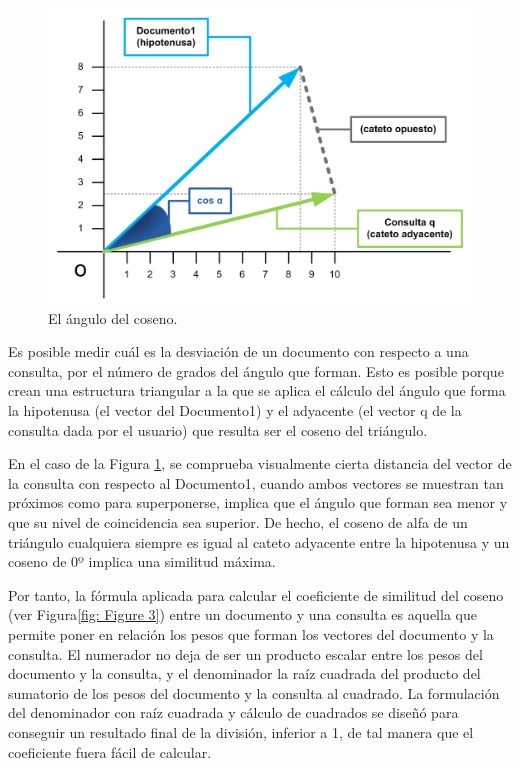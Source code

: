 \documentclass[titlepage]{article}
\begin{document}
\begin{figure}[h]
	\begin{center}
		\includegraphics*[scale=0.9]{similitud_coseno.png}
	\end{center}
	\caption{El ángulo del coseno.}
	\label{fig: Figure 2}
\end{figure}

Es posible medir cuál es la desviación de un documento con respecto a una consulta, por el número de grados del ángulo que forman. Esto es posible porque crean una estructura triangular a la que se aplica el cálculo del ángulo que forma la hipotenusa (el vector del Documento1) y el adyacente (el vector q de la consulta dada por el usuario) que resulta ser el coseno del triángulo. 

En el caso de la Figura \ref{fig: Figure 2}, se comprueba visualmente cierta distancia del vector de la consulta con respecto al Documento1, cuando ambos vectores se muestran tan próximos como para superponerse, implica que el ángulo que forman sea menor y que su nivel de coincidencia sea superior. De hecho, el coseno de alfa de un triángulo cualquiera siempre es igual al cateto adyacente entre la hipotenusa y un coseno de 0º implica una similitud máxima.

Por tanto, la fórmula aplicada para calcular el coeficiente de similitud del coseno (ver Figura\ref{fig: Figure 3}) entre un documento y una consulta es aquella que permite poner en relación los pesos que forman los vectores del documento y la consulta. El numerador no deja de ser un producto escalar entre los pesos del documento y la consulta, y el denominador la raíz cuadrada del producto del sumatorio de los pesos del documento y la consulta al cuadrado. La formulación del denominador con raíz cuadrada y cálculo de cuadrados se diseñó para conseguir un resultado final de la división, inferior a 1, de tal manera que el coeficiente fuera fácil de calcular.
\end{document}
